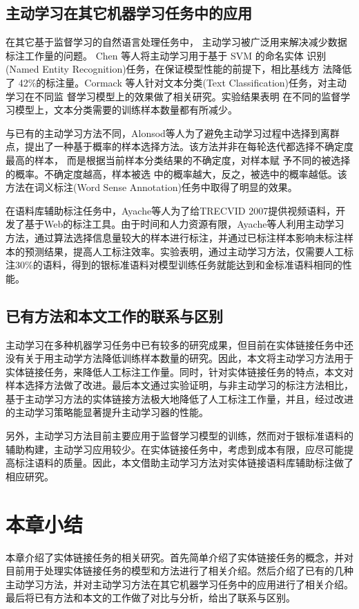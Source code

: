 \subsection{主动学习在其它机器学习任务中的应用}
在其它基于监督学习的自然语言处理任务中， 主动学习被广泛用来解决减少数据标注工作量的问题。 Chen 等人\cite{chen2015study}将主动学习用于基于 SVM 的命名实体 识别(Named Entity Recognition)任务，在保证模型性能的前提下，相比基线方 法降低了 42\%的标注量。Cormack 等人\cite{cormack2016scalability}针对文本分类(Text Classification)任务，对主动学习在不同监 督学习模型上的效果做了相关研究。实验结果表明 在不同的监督学习模型上，文本分类需要的训练样本数量都有所减少。

与已有的主动学习方法不同，Alonsod等人\cite{alonso2015active}为了避免主动学习过程中选择到离群点，提出了一种基于概率的样本选择方法。该方法并非在每轮迭代都选择不确定度最高的样本， 而是根据当前样本分类结果的不确定度，对样本赋 予不同的被选择的概率。不确定度越高，样本被选 中的概率越大，反之，被选中的概率越低。该方法在词义标注(Word Sense Annotation)任务中取得了明显的效果。

在语料库辅助标注任务中，Ayache等人\cite{ayache2008video}为了给TRECVID 2007提供视频语料，开发了基于Web的标注工具。由于时间和人力资源有限，Ayache等人利用主动学习方法，通过算法选择信息量较大的样本进行标注，并通过已标注样本影响未标注样本的预测结果，提高人工标注效率。实验表明，通过主动学习方法，仅需要人工标注30\%的语料，得到的银标准语料对模型训练任务就能达到和金标准语料相同的性能。

\subsection{已有方法和本文工作的联系与区别}
主动学习在多种机器学习任务中已有较多的研究成果，但目前在实体链接任务中还没有关于用主动学方法降低训练样本数量的研究。因此，本文将主动学习方法用于实体链接任务，来降低人工标注工作量。同时，针对实体链接任务的特点，本文对样本选择方法做了改进。最后本文通过实验证明，与非主动学习的标注方法相比，基于主动学习方法的实体链接方法极大地降低了人工标注工作量，并且，经过改进的主动学习策略能显著提升主动学习器的性能。

另外，主动学习方法目前主要应用于监督学习模型的训练，然而对于银标准语料的辅助构建，主动学习应用较少。在实体链接任务中，考虑到成本有限，应尽可能提高标注语料的质量。因此，本文借助主动学习方法对实体链接语料库辅助标注做了相应研究。

\section{本章小结}
本章介绍了实体链接任务的相关研究。首先简单介绍了实体链接任务的概念，并对目前用于处理实体链接任务的模型和方法进行了相关介绍。然后介绍了已有的几种主动学习方法，并对主动学习方法在其它机器学习任务中的应用进行了相关介绍。最后将已有方法和本文的工作做了对比与分析，给出了联系与区别。
